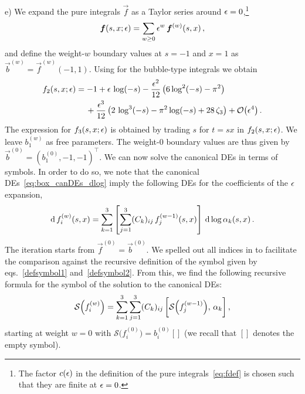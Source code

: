 \smallskip
\noindent
e) We expand the pure integrals $\vec{f}$ as a Taylor series around $\epsilon=0$,\footnote{The factor $c(\epsilon)$ in the definition of the pure integrals~\eqref{eq:fdef} is chosen such that they are finite at $\epsilon=0$.}
\begin{align} \label{eq:f_eps_exp}
\vec{f}(s,x;\eps) = \sum_{w\ge 0} \eps^w \, \vec{f}^{(w)}(s,x) \,,
\end{align}
and define the weight-$w$ boundary values at $s=-1$ and $x=1$ as $\vec{b}^{(w)} = \vec{f}^{(w)}(-1,1)$.
Using  for the bubble-type integrals we obtain
\begin{align} \label{eq:f23analytic} \begin{aligned}
& f_2(s,x;\eps) = -1+ \eps \, \log(-s) - \frac{\eps^2}{12} \left(6 \log^2(-s)-\pi^2\right) \\
& \phantom{f_2(s,x;\eps) = \, } + \frac{\eps^3}{12} \left(2 \, \log^3(-s)-\pi^2 \log(-s)+28 \, \zeta_3 \right) + \mathcal{O}\bigl(\eps^4\bigr) \,. \\
\end{aligned} \end{align}
The expression for $f_3(s,x;\epsilon)$ is obtained by trading $s$ for $t = s x$ in $f_2(s,x;\epsilon)$.
We leave $b_1^{(w)}$ as free parameters. The weight-$0$ boundary values are thus given by $ \vec{b}^{(0)} = (b_1^{(0)}, -1, -1)^{\top}$. We can now solve the canonical DEs in terms of symbols. In order to do so, we note that the canonical DEs~\eqref{eq:box_canDEs_dlog} imply the following DEs for the coefficients of the $\epsilon$ expansion,
\begin{align} \label{eq:box_canDEs_iteration}
\mathrm{d} \, f_i^{(w)}(s,x) =  \sum_{k=1}^3 \left[ \sum_{j=1}^3 (C_{k})_{ij} \, f_j^{(w-1)}(s,x) \right] \, \mathrm{d} \log\alpha_k(s,x) \,.
\end{align}
The iteration starts from $\vec{f}^{(0)} = \vec{b}^{(0)}$. We spelled out all indices in  to facilitate the comparison against the recursive definition of the symbol given by eqs.~\eqref{defsymbol1} and~\eqref{defsymbol2}. From this, we find the following recursive formula for the symbol of the solution to the canonical DEs:
\begin{align}
\mathcal{S} \Bigl( f_i^{(w)} \Bigr) = \sum_{k=1}^3 \sum_{j=1}^3 (C_{k})_{ij} \, \biggl[ \mathcal{S} \Bigl( f_j^{(w-1)} \Bigr) , \, \alpha_k \biggr] \,,
\end{align}
starting at weight $w=0$ with $\mathcal{S} \bigl( f_i^{(0)} \bigr) = b^{(0)}_i []$ (we recall that $[]$ denotes the empty symbol).
